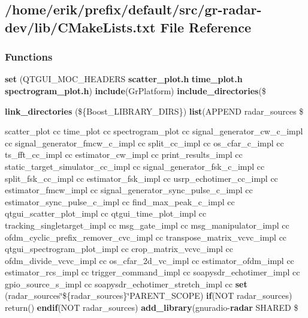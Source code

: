 \subsection{/home/erik/prefix/default/src/gr-\/radar-\/dev/lib/\+C\+Make\+Lists.txt File Reference}
\label{gr-radar-dev_2lib_2CMakeLists_8txt}
\subsubsection*{Functions}
\begin{DoxyCompactItemize}
\item 
{\bf set} (Q\+T\+G\+U\+I\+\_\+\+M\+O\+C\+\_\+\+H\+E\+A\+D\+E\+RS {\bf scatter\+\_\+plot.\+h} {\bf time\+\_\+plot.\+h} {\bf spectrogram\+\_\+plot.\+h}) {\bf include}(Gr\+Platform) {\bf include\+\_\+directories}(\$
\item 
{\bf link\+\_\+directories} (\$\{Boost\+\_\+\+L\+I\+B\+R\+A\+R\+Y\+\_\+\+D\+I\+RS\}) {\bf list}(A\+P\+P\+E\+ND radar\+\_\+sources \$
\item 
scatter\+\_\+plot cc time\+\_\+plot cc spectrogram\+\_\+plot cc signal\+\_\+generator\+\_\+cw\+\_\+c\+\_\+impl cc signal\+\_\+generator\+\_\+fmcw\+\_\+c\+\_\+impl cc split\+\_\+cc\+\_\+impl cc os\+\_\+cfar\+\_\+c\+\_\+impl cc ts\+\_\+fft\+\_\+cc\+\_\+impl cc estimator\+\_\+cw\+\_\+impl cc print\+\_\+results\+\_\+impl cc static\+\_\+target\+\_\+simulator\+\_\+cc\+\_\+impl cc signal\+\_\+generator\+\_\+fsk\+\_\+c\+\_\+impl cc split\+\_\+fsk\+\_\+cc\+\_\+impl cc estimator\+\_\+fsk\+\_\+impl cc usrp\+\_\+echotimer\+\_\+cc\+\_\+impl cc estimator\+\_\+fmcw\+\_\+impl cc signal\+\_\+generator\+\_\+sync\+\_\+pulse\+\_\+c\+\_\+impl cc estimator\+\_\+sync\+\_\+pulse\+\_\+c\+\_\+impl cc find\+\_\+max\+\_\+peak\+\_\+c\+\_\+impl cc qtgui\+\_\+scatter\+\_\+plot\+\_\+impl cc qtgui\+\_\+time\+\_\+plot\+\_\+impl cc tracking\+\_\+singletarget\+\_\+impl cc msg\+\_\+gate\+\_\+impl cc msg\+\_\+manipulator\+\_\+impl cc ofdm\+\_\+cyclic\+\_\+prefix\+\_\+remover\+\_\+cvc\+\_\+impl cc transpose\+\_\+matrix\+\_\+vcvc\+\_\+impl cc qtgui\+\_\+spectrogram\+\_\+plot\+\_\+impl cc crop\+\_\+matrix\+\_\+vcvc\+\_\+impl cc ofdm\+\_\+divide\+\_\+vcvc\+\_\+impl cc os\+\_\+cfar\+\_\+2d\+\_\+vc\+\_\+impl cc estimator\+\_\+ofdm\+\_\+impl cc estimator\+\_\+rcs\+\_\+impl cc trigger\+\_\+command\+\_\+impl cc soapysdr\+\_\+echotimer\+\_\+impl cc gpio\+\_\+source\+\_\+s\+\_\+impl cc soapysdr\+\_\+echotimer\+\_\+stretch\+\_\+impl cc {\bf set} (radar\+\_\+sources\char`\"{}\$\{radar\+\_\+sources\}\char`\"{}P\+A\+R\+E\+N\+T\+\_\+\+S\+C\+O\+PE) {\bf if}(N\+OT radar\+\_\+sources) return() {\bf endif}(N\+OT radar\+\_\+sources) {\bf add\+\_\+library}(gnuradio-\/{\bf radar} S\+H\+A\+R\+ED \$

\end{DoxyCompactItemize}
